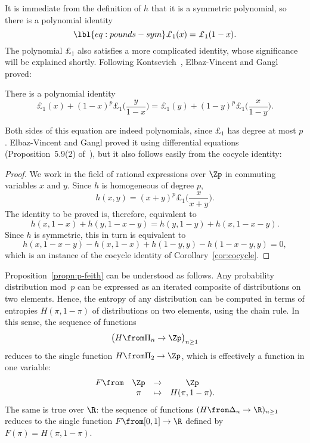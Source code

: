 It is immediate from the definition of $h$ that it is a symmetric
polynomial, so there is a polynomial identity
% 
\begin{equation}
\lbl{eq:pounds-sym}
\pounds_1(x) = \pounds_1(1 - x).
\end{equation}
% 
The polynomial $\pounds_1$ also satisfies a more complicated identity,
whose significance will be explained shortly.  Following
Kontsevich~\cite{KontOHL}, Elbaz-Vincent and Gangl proved: 
  
\begin{propn}
%
%
%
%
There is a polynomial identity
\[
\pounds_1(x) + (1 - x)^p \pounds_1\biggl( \frac{y}{1 - x} \biggr)
=
\pounds_1(y) + (1 - y)^p \pounds_1\biggl( \frac{x}{1 - y} \biggr).
\]
\end{propn}

Both sides of this equation are indeed polynomials, since $\pounds_1$ has
degree at most $p$.  Elbaz-Vincent and Gangl proved it using differential
equations (Proposition~5.9(2) of~\cite{EVGOPI}), but it also follows easily
from the cocycle identity:

\begin{proof}
We work in the field of rational expressions over $\Zp$ in commuting
variables $x$ and $y$.  Since $h$ is homogeneous of degree $p$,
\[
h(x, y) = (x + y)^p \pounds_1\biggl( \frac{x}{x + y} \biggr).
\]
The identity to be proved is, therefore, equivalent to
\[
h(x, 1 - x) + h(y, 1 - x - y)
=
h(y, 1 - y) + h(x, 1 - x - y).
\]
Since $h$ is symmetric, this in turn is equivalent to
\[
h(x, 1 - x - y) - h(x, 1 - x) + h(1 - y, y) - h(1 - x - y, y) = 0,
\]
which is an instance of the cocycle identity
of Corollary~\ref{cor:cocycle}. 
\end{proof}

Proposition~\ref{propn:p-feith} can be understood as follows.  Any
probability distribution mod~$p$ can be expressed as an iterated composite
of distributions on two elements.  Hence, the entropy of any distribution
can be computed in terms of entropies $H(\pi, 1 - \pi)$ of distributions on
two elements, using the chain rule.  In this sense, the sequence of
functions
\[
\bigl( H \from \Pi_n \to \Zp \bigr)_{n \geq 1}
\]
reduces to the single function $H \from \Pi_2 \to \Zp$, which is
effectively a function in one variable:
\[
\begin{array}{cccc}
F\from  &\Zp    &\to            &\Zp    \\
        &\pi    &\mapsto        &H(\pi, 1 - \pi).
\end{array}
\]
The same is true over $\R$: the sequence of functions $(H \from \Delta_n
\to \R)_{n \geq 1}$ reduces to the single function $F \from [0, 1] \to \R$
defined by $F(\pi) = H(\pi, 1 - \pi)$.

